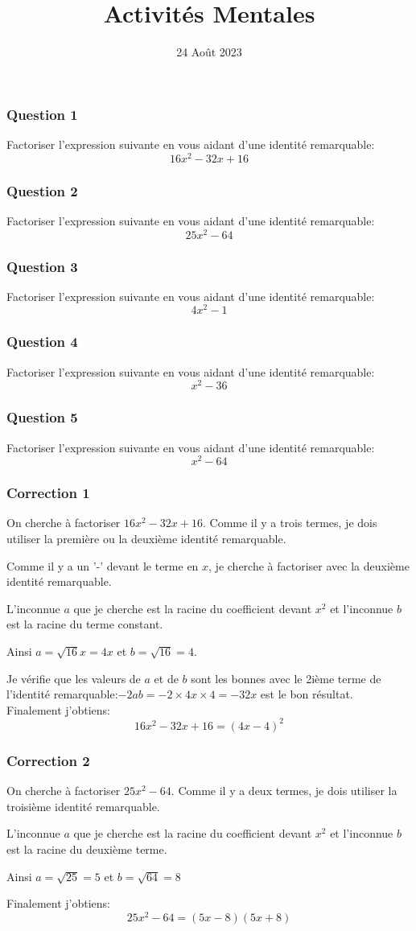 \documentclass[15pt, mathserif]{beamer}
\title{Activités Mentales}
\date{24 Août 2023}
\begin{document}
\begin{frame}
    \titlepage
\end{frame}

\begin{frame} 
	\frametitle{Question 1}
Factoriser l'expression suivante en vous aidant d'une identité remarquable: \[16x^2-32x+16\]\end{frame}


\begin{frame} 
	\frametitle{Question 2}
Factoriser l'expression suivante en vous aidant d'une identité remarquable: \[25x^2-64\]\end{frame}


\begin{frame} 
	\frametitle{Question 3}
Factoriser l'expression suivante en vous aidant d'une identité remarquable: \[4x^2-1\]\end{frame}


\begin{frame} 
	\frametitle{Question 4}
Factoriser l'expression suivante en vous aidant d'une identité remarquable: \[x^2-36\]\end{frame}


\begin{frame} 
	\frametitle{Question 5}
Factoriser l'expression suivante en vous aidant d'une identité remarquable: \[x^2-64\]\end{frame}


\begin{frame}
\vspace{-10mm}
	\frametitle{Correction 1}
On cherche à factoriser $16x^2-32x+16$. 
Comme il y a trois termes, je dois utiliser la première ou la deuxième identité remarquable. 

 Comme il y a un '-' devant le terme en $x$, je cherche à factoriser avec la deuxième identité remarquable. 

 L'inconnue $a$ que je cherche est la racine du coefficient devant $x^2$ et l'inconnue $b$ est la racine du terme constant. 

 Ainsi $a = \sqrt{16}x = 4x$ et $b = \sqrt{16} = 4$. 

 Je vérifie que les valeurs de $a$ et de $b$ sont les bonnes avec le 2ième terme de l'identité remarquable:$-2ab=-2\times4x \times4= -32x$ est le bon résultat. Finalement j'obtiens: \[16x^2-32x+16= (4x-4)^2\]
\end{frame}


\begin{frame}
\vspace{-10mm}
	\frametitle{Correction 2}
On cherche à factoriser $25x^2-64$. 
Comme il y a deux termes, je dois utiliser la troisième identité remarquable. 

 L'inconnue $a$ que je cherche est la racine du coefficient devant $x^2$ et l'inconnue $b$ est la racine du deuxième terme. 

 Ainsi $a = \sqrt{25} = 5$ et $b = \sqrt{64} = 8$

 Finalement j'obtiens: \[25x^2-64= (5x-8)(5x+8)\]
\end{frame}
\end{document}
